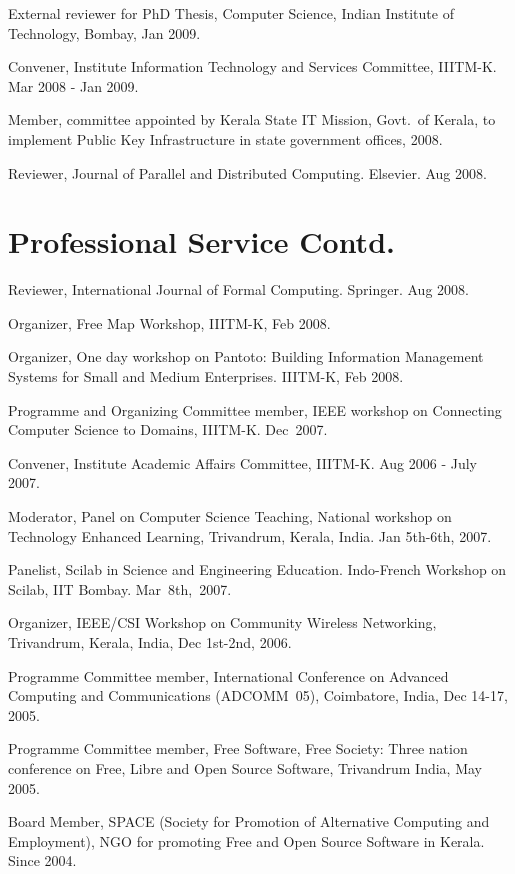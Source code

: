 \documentclass[11pt,margin,line]{res}
\begin{document}
\begin{resume}

External reviewer for PhD Thesis, Computer Science, Indian
Institute of Technology, Bombay, Jan 2009.

Convener, Institute Information Technology and Services
Committee, IIITM-K.  Mar 2008 - Jan 2009.

Member, committee appointed by Kerala State IT Mission,
Govt.~of Kerala, to implement Public Key Infrastructure in
state government offices, 2008.


Reviewer, Journal of Parallel and Distributed Computing.
Elsevier. Aug 2008.

\newpage

\section{\sc Professional Service Contd.}

Reviewer, International Journal of Formal Computing.
Springer. Aug 2008.

Organizer, Free Map Workshop, IIITM-K, Feb 2008. 

Organizer, One day workshop on Pantoto: Building Information
Management Systems for Small and Medium Enterprises. 
IIITM-K, Feb 2008.


Programme and Organizing Committee member, IEEE workshop on
Connecting Computer Science to Domains, IIITM-K.  Dec~2007.

Convener, Institute Academic Affairs Committee, IIITM-K.
Aug 2006 - July 2007.


Moderator, Panel on Computer Science Teaching, National
workshop on Technology Enhanced Learning, Trivandrum,
Kerala, India.  Jan 5th-6th, 2007.

Panelist, Scilab in Science and Engineering Education.
Indo-French Workshop on Scilab, IIT Bombay.  Mar~8th,~2007.

Organizer, IEEE/CSI Workshop on Community Wireless
Networking, Trivandrum, Kerala, India, Dec 1st-2nd, 2006.

Programme Committee member, International Conference on
Advanced Computing and Communications (ADCOMM~05),
Coimbatore, India, Dec 14-17, 2005.

Programme Committee member, Free Software, Free Society: Three
nation conference on Free, Libre and Open Source Software,
Trivandrum India, May 2005.

Board Member, SPACE (Society for Promotion of Alternative
Computing and Employment), NGO for promoting Free and Open
Source Software in Kerala. Since 2004.


\end{resume}
\end{document}
